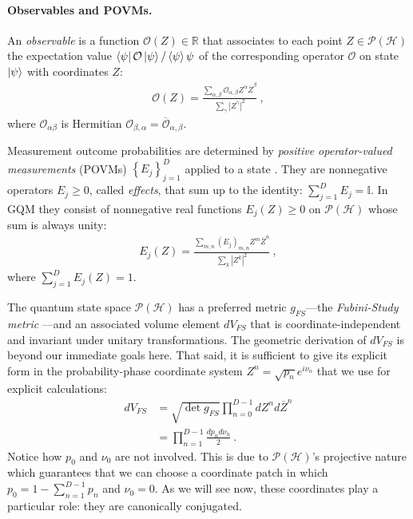 \documentclass[draft,nofootinbib,pre,twocolumn,showpacs,showkeys,preprintnumbers,floatfix]{revtex4-1}
\newcommand{\1}{\mathbbm{1}}
\begin{document}
\paragraph*{Observables and POVMs.} An \emph{observable} is a function $\mathcal{O}(Z) \in
\mathbb{R}$ that associates to each point  $Z \in \mathcal{P}(\mathcal{H})$ the
expectation value $\bra{\psi} \mathcal{O} \ket{\psi}/\braket{\psi}{\psi}$ of the corresponding
operator $\mathcal{O}$ on state $\ket{\psi}$ with coordinates $Z$:
\begin{align}
\mathcal{O}(Z) = \frac{\sum_{\alpha,\beta} \mathcal{O}_{\alpha,\beta}Z^\alpha \overline{Z}^\beta}{\sum_{\gamma} \left\vert Z^\gamma\right\vert^2}
  ~,
\label{eq:GQM_Observable}
\end{align}
where $\mathcal{O}_{\alpha \beta}$ is Hermitian $\mathcal{O}_{\beta,\alpha} = \overline{\mathcal{O}}_{\alpha,\beta}$.

Measurement outcome probabilities are determined by \emph{positive
operator-valued measurements} (POVMs) $\left\{E_j\right\}_{j=1}^D$ applied to a
state \cite{Nielsen2010,Heinosaari2012}. They are nonnegative operators
$E_j\geq 0$, called \emph{effects}, that sum up to the identity: $\sum_{j=1}^{D}
E_j = \mathbb{I}$. In GQM they consist of nonnegative real functions $E_j(Z)\ge
0$ on $\mathcal{P}(\mathcal{H})$ whose sum is always unity:
\begin{align}
E_j(Z) = \frac{\sum_{m,n}
  \left(E_j\right)_{m,n} Z^m \overline{Z}^n}{\sum_{k} \left\vert Z^k \right\vert^2}
  ~,
\label{eq:GQM_POVMs}
\end{align}
where $\sum_{j=1}^{D}E_j(Z) = 1$.

The quantum state space $\mathcal{P}(\mathcal{H})$ has a preferred metric 
$g_{FS}$---the \emph{Fubini-Study metric} \cite{Bengtsson2017}---and an 
associated volume element $dV_{FS}$ that is coordinate-independent and
invariant under unitary transformations. The geometric derivation of $dV_{FS}$
is beyond our immediate goals here. That said, it is sufficient to give its
explicit form in the probability-phase coordinate system $Z^n =
\sqrt{p_n}e^{i\nu_n}$ that we use for explicit calculations: 
\begin{align*}
dV_{FS}
  & = \sqrt{\det g_{FS}}
  \prod_{n=0}^{D-1} dZ^n d\overline{Z}^n \\
  & =  \prod_{n=1}^{D-1} \frac{dp_n d\nu_n}{2}
  ~.
\end{align*}
Notice how $p_0$ and $\nu_0$ are not involved. This is due to
$\mathcal{P}(\mathcal{H})$'s projective nature which guarantees that we can
choose a coordinate patch in which $p_0 = 1 - \sum_{n=1}^{D-1}p_n$
and $\nu_0 = 0$. As we will see now, these coordinates play a particular role:
they are canonically conjugated.
\end{document}
